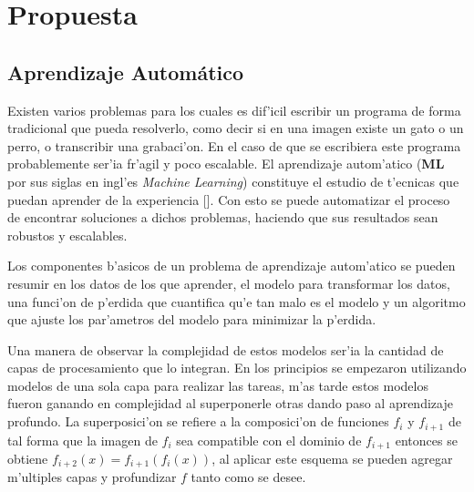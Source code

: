 \chapter{Propuesta}\label{chapter:proposal}



\section{Aprendizaje Automático}


Existen varios problemas para los cuales es dif'icil escribir un programa de forma tradicional que pueda
resolverlo, como decir si en una imagen existe un gato o un perro, o transcribir una grabaci'on. En el caso
de que se escribiera este programa probablemente ser'ia fr'agil y poco escalable. El aprendizaje autom'atico
(\textbf{ML} por sus siglas en ingl'es \emph{Machine Learning}) constituye el estudio de t'ecnicas que puedan 
aprender de la experiencia [\cite{d2l}]. Con esto se puede automatizar el proceso de encontrar soluciones a 
dichos problemas, haciendo que sus resultados sean robustos y escalables.

Los componentes b'asicos de un problema de aprendizaje autom'atico se pueden resumir en los datos de los que 
aprender, el modelo para transformar los datos, una funci'on de p'erdida que cuantifica qu'e tan malo es el modelo 
y un algoritmo que ajuste los par'ametros del modelo para minimizar la p'erdida.

Una manera de observar la complejidad de estos modelos ser'ia la cantidad de capas de procesamiento que lo integran.
En los principios se empezaron utilizando modelos de una sola capa para realizar las tareas, m'as tarde estos modelos
fueron ganando en complejidad al superponerle otras dando paso al aprendizaje profundo.
La superposici'on se refiere
a la composici'on de funciones $f_i$ y $f_{i+1}$ de tal forma que la imagen de $f_i$ sea compatible con el dominio de 
$f_{i+1}$ entonces se obtiene $f_{i+2}(x) = f_{i+1}(f_i(x))$, al aplicar este esquema se pueden agregar m'ultiples
capas y profundizar $f$ tanto como se desee.

